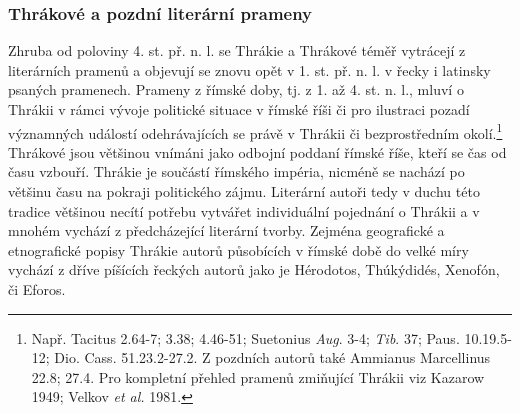 \subsubsection[thrákové-a-pozdní-literární-prameny]{Thrákové a pozdní literární prameny}

Zhruba od poloviny 4. st. př. n. l. se Thrákie a Thrákové téměř vytrácejí z literárních pramenů a objevují se znovu opět v 1. st. př. n. l. v řecky i latinsky psaných pramenech. Prameny z římské doby, tj. z 1. až 4. st. n. l., mluví o Thrákii v rámci vývoje politické situace v římské říši či pro ilustraci pozadí významných událostí odehrávajících se právě v Thrákii či bezprostředním okolí.\footnote{Např. Tacitus 2.64-7; 3.38; 4.46-51; Suetonius {\em Aug}. 3-4; {\em Tib}. 37; Paus. 10.19.5-12; Dio. Cass. 51.23.2-27.2. Z pozdních autorů také Ammianus Marcellinus 22.8; 27.4. Pro kompletní přehled pramenů zmiňující Thrákii viz Kazarow 1949; Velkov {\em et al.} 1981.} Thrákové jsou většinou vnímáni jako odbojní poddaní římské říše, kteří se čas od času vzbouří. Thrákie je součástí římského impéria, nicméně se nachází po většinu času na pokraji politického zájmu. Literární autoři tedy v duchu této tradice většinou necítí potřebu vytvářet individuální pojednání o Thrákii a v mnohém vychází z předcházející literární tvorby. Zejména geografické a etnografické popisy Thrákie autorů působících v římské době do velké míry vychází z dříve píšících řeckých autorů jako je Hérodotos, Thúkýdidés, Xenofón, či Eforos.

